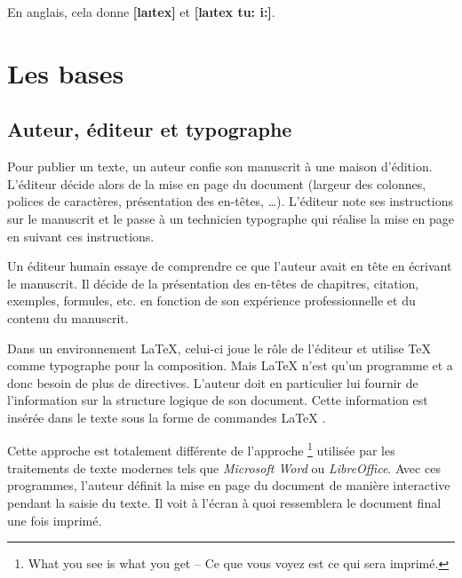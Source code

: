 En anglais, cela donne \textbf{[la\i{}tex]} et \textbf{[la\i{}tex tu:
i:]}.


% 

\section{Les bases}

\subsection{Auteur, éditeur et typographe}

Pour publier un texte, un auteur confie son manuscrit  à une maison
d'édition. L'éditeur décide alors de la mise en page du document
(largeur des colonnes, polices de caractères, présentation des
en-têtes, \dots). L'éditeur note ses instructions sur le manuscrit et
le passe à un technicien typographe qui réalise la mise en page
en suivant ces instructions.

Un éditeur humain essaye de comprendre ce que l'auteur avait en tête en
écrivant le manuscrit. Il décide de la présentation des en-têtes de chapitres,
citation, exemples, formules, etc. en fonction de son expérience
professionnelle et du contenu du manuscrit.

Dans un environnement \LaTeX{}, celui-ci joue le rôle de l'éditeur et
utilise \TeX{} comme typographe pour la composition. Mais \LaTeX{}
n'est qu'un programme et a donc besoin de plus de directives. L'auteur
doit en particulier lui fournir de l'information sur la structure logique de son
document. Cette information est insérée dans le texte sous la forme de
\og commandes \LaTeX{} \fg{}.

Cette approche est totalement différente de l'approche
\footnote{What you see is what you get -- Ce que vous
voyez est ce qui sera imprimé.}  utilisée par les traitements de texte
modernes tels que \emph{\mbox{Microsoft} \mbox{Word}} ou
\emph{\mbox{LibreOffice}}. Avec ces programmes, l'auteur définit la
mise en page du document de manière interactive pendant la saisie du
texte. Il voit à l'écran à quoi ressemblera le document final une fois
imprimé.

